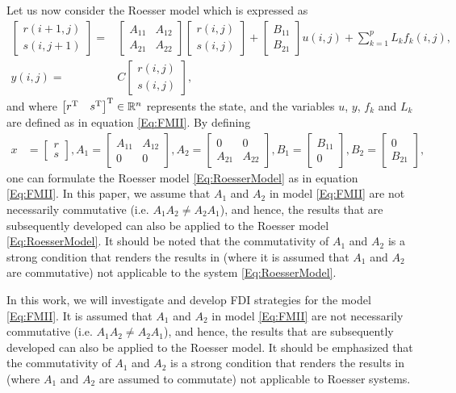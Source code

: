 \documentclass[journal,12pt,draftcls,onecolumn]{IEEEtran}
\newcommand{\tran}{\mathrm{T}}
\newcommand{\bbm}{\begin{bmatrix}}
\newcommand{\ebm}{\end{bmatrix}}
\begin{document}
Let us now consider the Roesser model \cite{Roess} which is expressed as
\begin{equation}\label{Eq:RoesserModel}
\begin{split}
\bbm r(i+1,j)\\s(i,j+1)\ebm = &\bbm A_{11} &A_{12}\\ A_{21} &A_{22}\ebm\bbm r(i,j)\\s(i,j)\ebm +\bbm B_{11}\\ B_{21}\ebm u(i,j)+\sum_{k=1}^p L_k f_k(i,j),\\
y(i,j) = &C\bbm r(i,j)\\s(i,j)\ebm,
\end{split}
\end{equation}
and where $\bbm r^\tran &s^\tran\ebm^\tran\in \fld{R}^n$ represents the state, and the variables $u$, $y$, $f_k$ and $L_k$ are defined as in equation \eqref{Eq:FMII}. By defining
\begin{equation}
\begin{split}
x &= \bbm r\\s\ebm, A_1 = \bbm A_{11} &A_{12}\\ 0 &0\ebm, A_2 = \bbm 0 &0\\ A_{21} &A_{22}\ebm,
B_1 = \bbm B_{11}\\0\ebm, B_2 = \bbm 0\\ B_{21}\ebm,
\end{split}
\end{equation}
one can formulate the Roesser model \eqref{Eq:RoesserModel} as in equation \eqref{Eq:FMII}. In this paper, we assume that $A_1$ and $A_2$ in model \eqref{Eq:FMII} are not necessarily commutative (i.e. $A_1A_2 \neq A_2A_1$), and hence, the results that are subsequently developed  can also be applied to the Roesser model \eqref{Eq:RoesserModel}. It should be noted that the commutativity of  $A_1$ and $A_2$ is a strong condition that renders the results in\cite{Valcher2013} (where it is assumed that $A_1$ and $A_2$ are commutative) not applicable to the system \eqref{Eq:RoesserModel}.

In this work, we will investigate and develop FDI strategies for the model \eqref{Eq:FMII}. It is assumed that $A_1$ and $A_2$ in model \eqref{Eq:FMII} are not necessarily commutative (i.e. $A_1A_2 \neq A_2A_1$), and hence, the results that are subsequently developed  can also be applied to the Roesser model. It should be emphasized that the commutativity of  $A_1$ and $A_2$ is a strong condition that renders the results in\cite{Valcher2013} (where  $A_1$ and $A_2$ are assumed to commutate) not applicable to Roesser systems.
\end{document}
